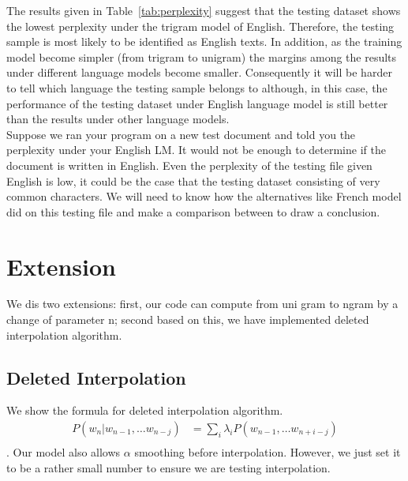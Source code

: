 \documentclass{article}
\begin{document}
The results given in Table~\ref{tab:perplexity} suggest that the testing dataset shows the lowest perplexity under the trigram model of English. Therefore, the testing sample is most likely to be identified as English texts. In addition, as the training model become simpler (from trigram to unigram) the margins among the results under different language models become smaller. Consequently it will be harder to tell which language the testing sample belongs to although, in this case, the performance of the testing dataset under English language model is still better than the results under other language models.\\

Suppose we ran your program on a new test document and told you the perplexity under your English LM. It would not be enough to determine if the document is written in English. Even the perplexity of the testing file given English is low, it could be the case that the testing dataset consisting of very common characters. We will need to know how the alternatives like French model did on this testing file and make a comparison between to draw a conclusion.


\section{Extension}
We dis two extensions: first, our code can compute from uni gram to ngram by a change of parameter n; second based on this, we have implemented deleted interpolation algorithm.
\subsection{Deleted Interpolation}
We show the formula for deleted interpolation algorithm.
\begin{eqnarray*}
P(w_n| w_{n-1},\dots w_{n-j}) &= \sum_i \lambda_i P(w_{n-1},\dots w_{n+i-j})\\
\end{eqnarray*}
.
Our model also allows $\alpha$ smoothing before interpolation. However, we just set it to be a rather small number to ensure we are testing interpolation.
\end{document}
